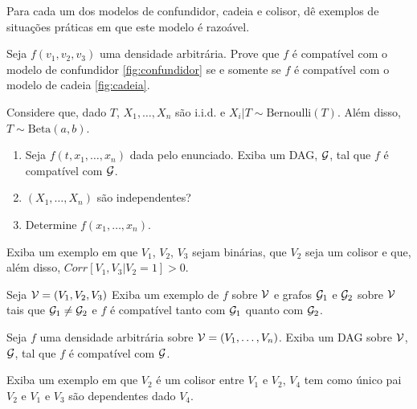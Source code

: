 \begin{exercise}
 Para cada um dos modelos de confundidor, cadeia e colisor,
 dê exemplos de situações práticas em que este modelo é razoável.
\end{exercise}

\begin{exercise}
 Seja $f(v_1,v_2,v_3)$ uma densidade arbitrária.
 Prove que $f$ é compatível com
 o modelo de confundidor \cref{fig:confundidor}
 se e somente se
 $f$ é compatível com
 o modelo de cadeia \cref{fig:cadeia}.
\end{exercise}

\begin{exercise}
 Considere que, dado $T$, $X_1,\ldots,X_n$ são i.i.d. e
 $X_i|T \sim \text{Bernoulli}(T)$. Além disso,
 $T \sim \text{Beta}(a,b)$.
 \begin{enumerate}[label=(\alph*)]
  \item Seja $f(t,x_1,\ldots,x_n)$ dada pelo enunciado.
  Exiba um DAG, ${\mathcal G}$, tal que $f$ é compatível com ${\mathcal G}$.
  \item $(X_1,\ldots,X_n)$ são independentes?
  \item Determine $f(x_1,\ldots,x_n)$.
 \end{enumerate}
\end{exercise}

\begin{exercise}
 Exiba um exemplo em que $V_1$, $V_2$, $V_3$ sejam binárias,
 que $V_2$ seja um colisor e que, além disso,
 $Corr[V_1,V_3|V_2=1] > 0$.
\end{exercise}

\begin{exercise}
 Seja ${\mathcal V} = (V_1, V_2, V_3)$
 Exiba um exemplo de $f$ sobre ${\mathcal V}$ e
 grafos ${\mathcal G}_1$ e ${\mathcal G}_2$ sobre ${\mathcal V}$ tais que
 ${\mathcal G}_1 \neq {\mathcal G}_2$ e
 $f$ é compatível tanto com ${\mathcal G}_1$ 
 quanto com ${\mathcal G}_2$.
\end{exercise}

\begin{exercise}
 Seja $f$ uma densidade arbitrária sobre ${\mathcal V} = (V_1,\ldots,V_n)$.
 Exiba um DAG sobre ${\mathcal V}$, ${\mathcal G}$,
 tal que $f$ é compatível com ${\mathcal G}$.
\end{exercise}

\begin{exercise}
 Exiba um exemplo em que $V_2$ é um colisor 
 entre $V_1$ e $V_2$, 
 $V_4$ tem como único pai $V_2$ e
 $V_1$ e $V_3$ são dependentes dado $V_4$.
\end{exercise}

